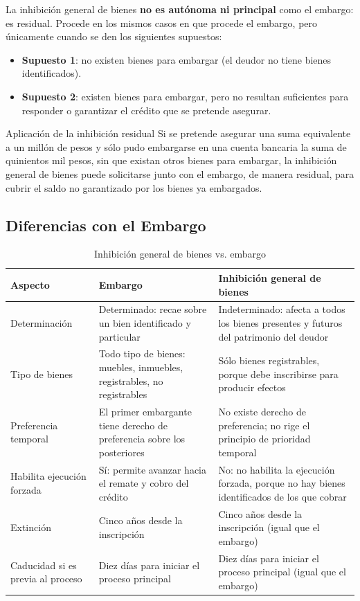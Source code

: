 \documentclass[12pt,oneside]{book}
\begin{document}
La inhibición general de bienes \textbf{no es autónoma ni principal} como el embargo: es residual. Procede en los mismos casos en que procede el embargo, pero únicamente cuando se den los siguientes supuestos:

\begin{itemize}
    \item \textbf{Supuesto 1}: no existen bienes para embargar (el deudor no tiene bienes identificados).
    \item \textbf{Supuesto 2}: existen bienes para embargar, pero no resultan suficientes para responder o garantizar el crédito que se pretende asegurar.
\end{itemize}

\begin{example}{Aplicación de la inhibición residual}
Si se pretende asegurar una suma equivalente a un millón de pesos y sólo pudo embargarse en una cuenta bancaria la suma de quinientos mil pesos, sin que existan otros bienes para embargar, la inhibición general de bienes puede solicitarse junto con el embargo, de manera residual, para cubrir el saldo no garantizado por los bienes ya embargados.
\end{example}

\subsection{Diferencias con el Embargo}

\begin{table}[H]
\centering
\caption{Inhibición general de bienes vs. embargo}
\begin{tabularx}{\textwidth}{>{\raggedright\arraybackslash}p{} >{\raggedright\arraybackslash}p{} >{\raggedright\arraybackslash}X}
\toprule
\textbf{Aspecto} & \textbf{Embargo} & \textbf{Inhibición general de bienes} \\
\midrule
Determinación & Determinado: recae sobre un bien identificado y particular & Indeterminado: afecta a todos los bienes presentes y futuros del patrimonio del deudor \\
Tipo de bienes & Todo tipo de bienes: muebles, inmuebles, registrables, no registrables & Sólo bienes registrables, porque debe inscribirse para producir efectos \\
Preferencia temporal & El primer embargante tiene derecho de preferencia sobre los posteriores & No existe derecho de preferencia; no rige el principio de prioridad temporal \\
Habilita ejecución forzada & Sí: permite avanzar hacia el remate y cobro del crédito & No: no habilita la ejecución forzada, porque no hay bienes identificados de los que cobrar \\
Extinción & Cinco años desde la inscripción & Cinco años desde la inscripción (igual que el embargo) \\
Caducidad si es previa al proceso & Diez días para iniciar el proceso principal & Diez días para iniciar el proceso principal (igual que el embargo) \\
\bottomrule
\end{tabularx}
\end{table}
\end{document}
